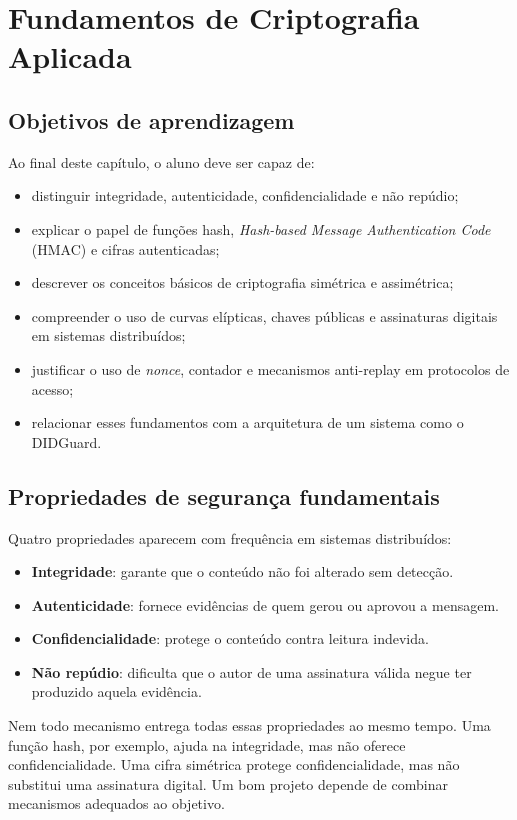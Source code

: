 \chapter{Fundamentos de Criptografia Aplicada}
\label{chap:criptografia-aplicada}

\section{Objetivos de aprendizagem}
Ao final deste capítulo, o aluno deve ser capaz de:
\begin{itemize}[leftmargin=*]
  \item distinguir integridade, autenticidade, confidencialidade e não repúdio;
  \item explicar o papel de funções hash, \textit{Hash-based Message Authentication Code} (HMAC) e cifras autenticadas;
  \item descrever os conceitos básicos de criptografia simétrica e assimétrica;
  \item compreender o uso de curvas elípticas, chaves públicas e assinaturas digitais em sistemas distribuídos;
  \item justificar o uso de \textit{nonce}, contador e mecanismos anti-replay em protocolos de acesso;
  \item relacionar esses fundamentos com a arquitetura de um sistema como o DIDGuard.
\end{itemize}
\section{Propriedades de segurança fundamentais}
Quatro propriedades aparecem com frequência em sistemas distribuídos:
\begin{itemize}[leftmargin=*]
  \item \textbf{Integridade}: garante que o conteúdo não foi alterado sem detecção.
  \item \textbf{Autenticidade}: fornece evidências de quem gerou ou aprovou a mensagem.
  \item \textbf{Confidencialidade}: protege o conteúdo contra leitura indevida.
  \item \textbf{Não repúdio}: dificulta que o autor de uma assinatura válida negue ter produzido aquela evidência.
\end{itemize}

Nem todo mecanismo entrega todas essas propriedades ao mesmo tempo. Uma função hash, por exemplo, ajuda na integridade, mas não oferece confidencialidade. Uma cifra simétrica protege confidencialidade, mas não substitui uma assinatura digital. Um bom projeto depende de combinar mecanismos adequados ao objetivo.

